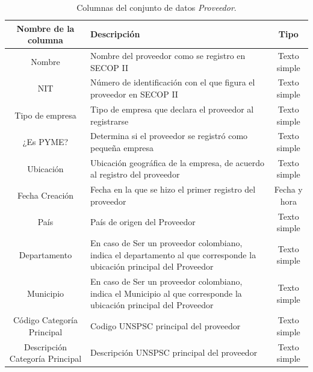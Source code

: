 \documentclass[11pt,letterpaper,oneside]{article}
\begin{document}
	\begin{table}[!htp]
		\tiny 
		\centering
		\begin{tabular}{|c|p{6.5cm}|c|}
			\hline
			\textbf{Nombre de la columna} & \textbf{Descripción} & \textbf{Tipo} \\
			\hline
			Nombre & Nombre del proveedor como se registro en SECOP II & Texto simple \\
			\hline
			NIT & Número de identificación con el que figura el proveedor en SECOP II & Texto simple \\
			\hline
			Tipo de empresa & Tipo de empresa que declara el proveedor al registrarse & Texto simple \\
			\hline
			¿Es PYME? & Determina si el proveedor se registró como pequeña empresa & Texto simple  \\
			\hline
			Ubicación & Ubicación geográfica de la empresa, de acuerdo al registro del proveedor & Texto simple \\
			\hline
			Fecha Creación & Fecha en la que se hizo el primer registro del proveedor & Fecha y hora \\
			\hline
			País & País de origen del Proveedor & Texto simple \\
			\hline
			Departamento & En caso de Ser un proveedor colombiano, indica el departamento al que corresponde la ubicación principal del Proveedor & Texto simple \\
			\hline
			Municipio & En caso de Ser un proveedor colombiano, indica el Municipio al que corresponde la ubicación principal del Proveedor & Texto simple \\
			\hline
			Código Categoría Principal & Codigo UNSPSC principal del proveedor & Texto simple \\
			\hline
			Descripción Categoría Principal & Descripción UNSPSC principal del proveedor & Texto simple \\
			\hline
		\end{tabular}
		\caption{Columnas del conjunto de datos \textit{Proveedor}.}
		\label{tab:t01}
	\end{table}
\end{document}
